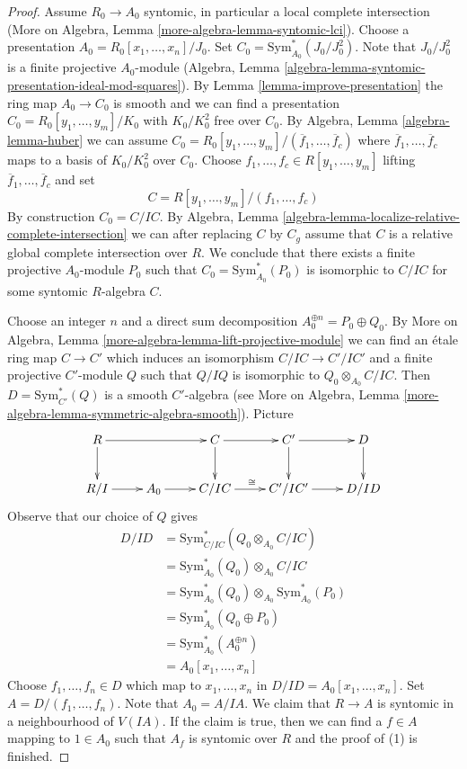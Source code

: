 \begin{proof}
Assume $R_0 \to A_0$ syntomic, in particular a local complete intersection
(More on Algebra, Lemma \ref{more-algebra-lemma-syntomic-lci}).
Choose a presentation $A_0 = R_0[x_1, \ldots, x_n]/J_0$. Set
$C_0 = \text{Sym}^*_{A_0}(J_0/J_0^2)$. Note that $J_0/J_0^2$ is a finite
projective $A_0$-module (Algebra, Lemma
\ref{algebra-lemma-syntomic-presentation-ideal-mod-squares}).
By Lemma \ref{lemma-improve-presentation} the ring map
$A_0 \to C_0$ is smooth and we can find a presentation
$C_0 = R_0[y_1, \ldots, y_m]/K_0$ with $K_0/K_0^2$ free over $C_0$.
By Algebra, Lemma \ref{algebra-lemma-huber} we can assume
$C_0 = R_0[y_1, \ldots, y_m]/(\overline{f}_1, \ldots, \overline{f}_c)$
where $\overline{f}_1, \ldots, \overline{f}_c$ maps to a basis of
$K_0/K_0^2$ over $C_0$. Choose
$f_1, \ldots, f_c \in R[y_1, \ldots, y_m]$ lifting
$\overline{f}_1, \ldots, \overline{f}_c$ and set
$$
C = R[y_1, \ldots, y_m]/(f_1, \ldots, f_c)
$$
By construction $C_0 = C/IC$. By Algebra, Lemma
\ref{algebra-lemma-localize-relative-complete-intersection}
we can after replacing $C$ by $C_g$ assume that $C$ is a relative
global complete intersection over $R$.
We conclude that there exists a finite projective $A_0$-module
$P_0$ such that $C_0 = \text{Sym}^*_{A_0}(P_0)$
is isomorphic to $C/IC$ for some syntomic $R$-algebra $C$.

\medskip\noindent
Choose an integer $n$ and a direct sum decomposition
$A_0^{\oplus n} = P_0 \oplus Q_0$.
By More on Algebra, Lemma \ref{more-algebra-lemma-lift-projective-module}
we can find an \'etale ring map $C \to C'$ which induces
an isomorphism $C/IC \to C'/IC'$ and a finite projective
$C'$-module $Q$ such that $Q/IQ$ is isomorphic to
$Q_0 \otimes_{A_0} C/IC$.
Then $D = \text{Sym}_{C'}^*(Q)$ is a smooth $C'$-algebra (see
More on Algebra, Lemma \ref{more-algebra-lemma-symmetric-algebra-smooth}).
Picture
$$
\xymatrix{
R \ar[d] \ar[rr] & &
C \ar[r] \ar[d] &
C' \ar[r] \ar[d] &
D \ar[d] \\
R/I \ar[r] &
A_0 \ar[r] &
C/IC \ar[r]^{\cong} &
C'/IC' \ar[r] &
D/ID
}
$$
Observe that our choice of $Q$ gives
\begin{align*}
D/ID & =
\text{Sym}_{C/IC}^*(Q_0 \otimes_{A_0} C/IC) \\
& =
\text{Sym}_{A_0}^*(Q_0) \otimes_{A_0} C/IC \\
& =
\text{Sym}_{A_0}^*(Q_0) \otimes_{A_0}
\text{Sym}_{A_0}^*(P_0) \\
& =
\text{Sym}_{A_0}^*(Q_0 \oplus P_0) \\
& =
\text{Sym}_{A_0}^*(A_0^{\oplus n}) \\
& =
A_0[x_1, \ldots, x_n]
\end{align*}
Choose $f_1, \ldots, f_n \in D$ which map to $x_1, \ldots, x_n$
in $D/ID = A_0[x_1, \ldots, x_n]$. Set $A = D/(f_1, \ldots, f_n)$.
Note that $A_0 = A/IA$. We claim that $R \to A$ is syntomic
in a neighbourhood of $V(IA)$. If the claim is true, then we can
find a $f \in A$ mapping to $1 \in A_0$ such that $A_f$ is syntomic
over $R$ and the proof of (1) is finished.


\end{proof}
